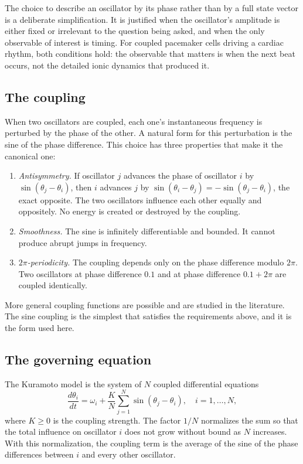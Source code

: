 \documentclass[11pt]{article}
\begin{document}
The choice to describe an oscillator by its phase rather than by a full
state vector is a deliberate simplification. It is justified when the
oscillator's amplitude is either fixed or irrelevant to the question
being asked, and when the only observable of interest is timing. For
coupled pacemaker cells driving a cardiac rhythm, both conditions hold:
the observable that matters is when the next beat occurs, not the
detailed ionic dynamics that produced it.

\subsection{The coupling}

When two oscillators are coupled, each one's instantaneous frequency is
perturbed by the phase of the other. A natural form for this
perturbation is the sine of the phase difference. This choice has three
properties that make it the canonical one:

\begin{enumerate}
\item \emph{Antisymmetry.} If oscillator $j$ advances the phase of
oscillator $i$ by $\sin(\theta_j - \theta_i)$, then $i$ advances $j$ by
$\sin(\theta_i - \theta_j) = -\sin(\theta_j - \theta_i)$, the exact
opposite. The two oscillators influence each other equally and
oppositely. No energy is created or destroyed by the coupling.
\item \emph{Smoothness.} The sine is infinitely differentiable and
bounded. It cannot produce abrupt jumps in frequency.
\item \emph{$2\pi$-periodicity.} The coupling depends only on the phase
difference modulo $2\pi$. Two oscillators at phase difference $0.1$ and
at phase difference $0.1 + 2\pi$ are coupled identically.
\end{enumerate}

More general coupling functions are possible and are studied in the
literature. The sine coupling is the simplest that satisfies the
requirements above, and it is the form used here.

\subsection{The governing equation}

The Kuramoto model is the system of $N$ coupled differential equations
\begin{equation}
\frac{d\theta_i}{dt} = \omega_i + \frac{K}{N}\sum_{j=1}^{N}
\sin(\theta_j - \theta_i), \quad i = 1, \ldots, N,
\label{eq:kuramoto}
\end{equation}
where $K \geq 0$ is the coupling strength. The factor $1/N$ normalizes
the sum so that the total influence on oscillator $i$ does not grow
without bound as $N$ increases. With this normalization, the coupling
term is the average of the sine of the phase differences between $i$
and every other oscillator.
\end{document}
